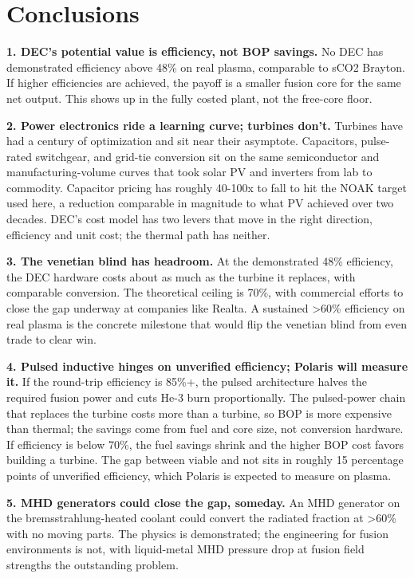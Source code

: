 \documentclass{article}
\begin{document}
\section{Conclusions}\label{conclusions}

\textbf{1. DEC's potential value is efficiency, not BOP savings.} No DEC
has demonstrated efficiency above 48\% on real plasma, comparable to
sCO2 Brayton. If higher efficiencies are achieved, the payoff is a
smaller fusion core for the same net output. This shows up in the fully
costed plant, not the free-core floor.

\textbf{2. Power electronics ride a learning curve; turbines don't.}
Turbines have had a century of optimization and sit near their
asymptote. Capacitors, pulse-rated switchgear, and grid-tie conversion
sit on the same semiconductor and manufacturing-volume curves that took
solar PV and inverters from lab to commodity. Capacitor pricing has
roughly 40-100x to fall to hit the NOAK target used here, a reduction
comparable in magnitude to what PV achieved over two decades. DEC's cost
model has two levers that move in the right direction, efficiency and
unit cost; the thermal path has neither.

\textbf{3. The venetian blind has headroom.} At the demonstrated 48\%
efficiency, the DEC hardware costs about as much as the turbine it
replaces, with comparable conversion. The theoretical ceiling is 70\%,
with commercial efforts to close the gap underway at companies like
Realta. A sustained \textgreater60\% efficiency on real plasma is the
concrete milestone that would flip the venetian blind from even trade to
clear win.

\textbf{4. Pulsed inductive hinges on unverified efficiency; Polaris
will measure it.} If the round-trip efficiency is 85\%+, the pulsed
architecture halves the required fusion power and cuts He-3 burn
proportionally. The pulsed-power chain that replaces the turbine costs
more than a turbine, so BOP is more expensive than thermal; the savings
come from fuel and core size, not conversion hardware. If efficiency is
below 70\%, the fuel savings shrink and the higher BOP cost favors
building a turbine. The gap between viable and not sits in roughly 15
percentage points of unverified efficiency, which Polaris is expected to
measure on plasma.

\textbf{5. MHD generators could close the gap, someday.} An MHD
generator on the bremsstrahlung-heated coolant could convert the
radiated fraction at \textgreater60\% with no moving parts. The physics
is demonstrated; the engineering for fusion environments is not, with
liquid-metal MHD pressure drop at fusion field strengths the outstanding
problem.
\end{document}
